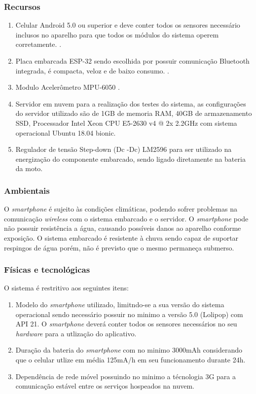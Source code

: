 \subsubsection{Recursos}

\begin{enumerate}
    \item Celular Android 5.0 ou superior  e deve conter todos os sensores necessário inclusos no aparelho para que todos os módulos do sistema operem corretamente.  \cite{Android}.
    \item Placa embarcada ESP-32 sendo escolhida por possuir comunicação Bluetooth integrada, é compacta, veloz e de baixo consumo. \cite{Esp32}.
    \item Modulo Acelerômetro MPU-6050 \cite{MPU6050}.
    \item Servidor em nuvem para a realização dos testes do sistema, as configurações do servidor utilizado são de  1GB de memoria RAM, 40GB de armazenamento SSD, Processador Intel Xeon CPU E5-2630 v4 @ 2x 2.2GHz com sistema operacional Ubuntu 18.04 bionic.
    \item Regulador de tensão Step-down (Dc -Dc) LM2596 para ser utilizado na energização do componente embarcado, sendo ligado diretamente na bateria da moto.\cite{StepDown}
\end{enumerate}


\subsubsection{Ambientais}
O \textit{smartphone} é sujeito às condições climáticas, podendo sofrer problemas na comunicação \textit{wireless} com o sistema embarcado e o servidor. O \textit{smartphone} pode não possuir resistência a água, causando possíveis danos ao aparelho conforme exposição. O sistema embarcado é resistente à chuva sendo capaz de suportar respingos de água porém, não é previsto que o mesmo permaneça submerso.


\subsubsection{Físicas e tecnológicas}
O sistema é restritivo aos seguintes itens:
\begin{enumerate}
    \item Modelo do \textit{smartphone} utilizado, limitndo-se a sua versão do sistema operacional sendo necessário possuir no minimo a versão 5.0 (Lolipop) com  API 21.
    O \textit{smartphone} deverá conter todos os sensores necessários no seu \textit{hardware} para a utlização do aplicativo.
    \item Duração da bateria do \textit{smartphone} com no minimo 3000mAh considerando que o celular utlize em média 125mA/h em seu funcionamento durante 24h.
    \item Dependência de rede móvel possuindo no minimo a técnologia 3G para a comunicação estável entre os serviços hospeados na nuvem.
\end{enumerate}


